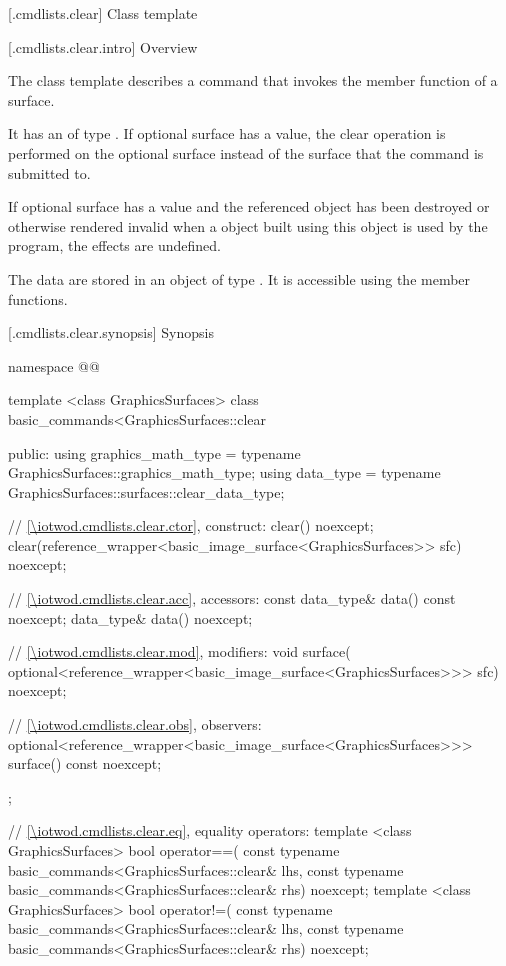 
 [\iotwod.cmdlists.clear] {Class template }

 [\iotwod.cmdlists.clear.intro] {Overview}

\pnum
{}%
The class template  describes a command that invokes the  member function of a surface.

\pnum
It has an  of type . If optional surface has a value, the clear operation is performed on the optional surface instead of the surface that the command is submitted to.

\pnum
If optional surface has a value and the referenced  object has been destroyed or otherwise rendered invalid when a  object built using this  object is used by the program, the effects are undefined.

\pnum
The data are stored in an object of type . It is accessible using the  member functions.

 [\iotwod.cmdlists.clear.synopsis] {Synopsis}
\begin{codeblock}
namespace @\fullnamespace{}@ {
  template <class GraphicsSurfaces>
  class basic_commands<GraphicsSurfaces::clear {
  public:
    using graphics_math_type = typename GraphicsSurfaces::graphics_math_type;
    using data_type = typename GraphicsSurfaces::surfaces::clear_data_type;

    // \ref{\iotwod.cmdlists.clear.ctor}, construct:
    clear() noexcept;
    clear(reference_wrapper<basic_image_surface<GraphicsSurfaces>> sfc) 
      noexcept;
    
    // \ref{\iotwod.cmdlists.clear.acc}, accessors:
    const data_type& data() const noexcept;
    data_type& data() noexcept;

    // \ref{\iotwod.cmdlists.clear.mod}, modifiers:
    void surface(
      optional<reference_wrapper<basic_image_surface<GraphicsSurfaces>>> sfc) 
      noexcept;

    // \ref{\iotwod.cmdlists.clear.obs}, observers:
    optional<reference_wrapper<basic_image_surface<GraphicsSurfaces>>> 
      surface() const noexcept;
  };

  // \ref{\iotwod.cmdlists.clear.eq}, equality operators:
  template <class GraphicsSurfaces>
  bool operator==(
    const typename basic_commands<GraphicsSurfaces::clear& lhs,
    const typename basic_commands<GraphicsSurfaces::clear& rhs) 
    noexcept;
  template <class GraphicsSurfaces>
  bool operator!=(
    const typename basic_commands<GraphicsSurfaces::clear& lhs,
    const typename basic_commands<GraphicsSurfaces::clear& rhs) 
    noexcept;
}
\end{codeblock}

